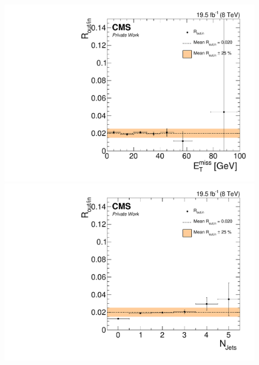 \begin{figure}[htbp]
\centering
\begin{minipage}[t]{0.49\textwidth}
  \includegraphics[width=\textwidth]{plots/BG/rOutIn/rOutInSyst_DrellYanControlCentral_Full2012_MET_HighMass_MM_None.pdf}
\end{minipage}
\begin{minipage}[t]{0.49\textwidth}
\includegraphics[width=\textwidth]{plots/BG/rOutIn/rOutInSyst_DrellYanControlCentral_Full2012_NJets_HighMass_MM_None.pdf}
\end{minipage}
\begin{minipage}[t]{0.49\textwidth}

\end{minipage}
\end{figure}

